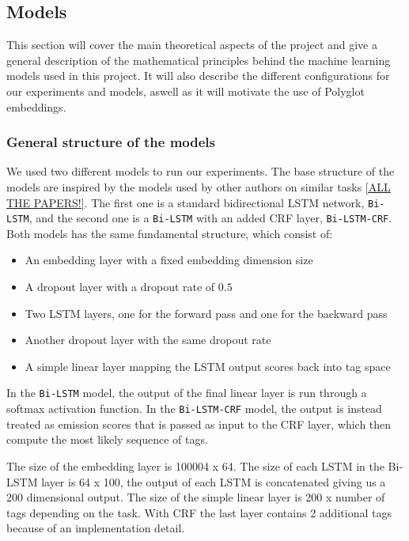 
\subsection{Models}

This section will cover the main theoretical aspects of the project and give a
general description of the mathematical principles behind the machine learning
models used in this project. It will also describe the different configurations
for our experiments and models, aswell as it will motivate the use of Polyglot
embeddings.


\subsubsection{General structure of the models}

We used two different models to run our experiments. The base structure of the
models are inspired by the models used by other authors on similar tasks
\ref{ALL THE PAPERS!}. The first one is a standard bidirectional LSTM network,
\texttt{Bi-LSTM}, and the second one is a \texttt{Bi-LSTM} with an added CRF
layer, \texttt{Bi-LSTM-CRF}. Both models has the same fundamental structure,
which consist of:

\begin{itemize}
    \item An embedding layer with a fixed embedding dimension size
    \item A dropout layer with a dropout rate of $0.5$
    \item Two LSTM layers, one for the forward pass and one for the backward
        pass
    \item Another dropout layer with the same dropout rate
    \item A simple linear layer mapping the LSTM output scores back into tag
        space
\end{itemize}

In the \texttt{Bi-LSTM} model, the output of the final linear layer is run
through a softmax activation function. In the \texttt{Bi-LSTM-CRF} model, the
output is instead treated as emission scores that is passed as input to the CRF
layer, which then compute the most likely sequence of tags.

The size of the embedding layer is 100004 x 64. The size of each LSTM in the
Bi-LSTM layer is 64 x 100, the output of each LSTM is concatenated giving us a
200 dimensional output. The size of the simple linear layer is 200 x number of
tags depending on the task. With CRF the last layer contains 2 additional tags
because of an implementation detail. 

